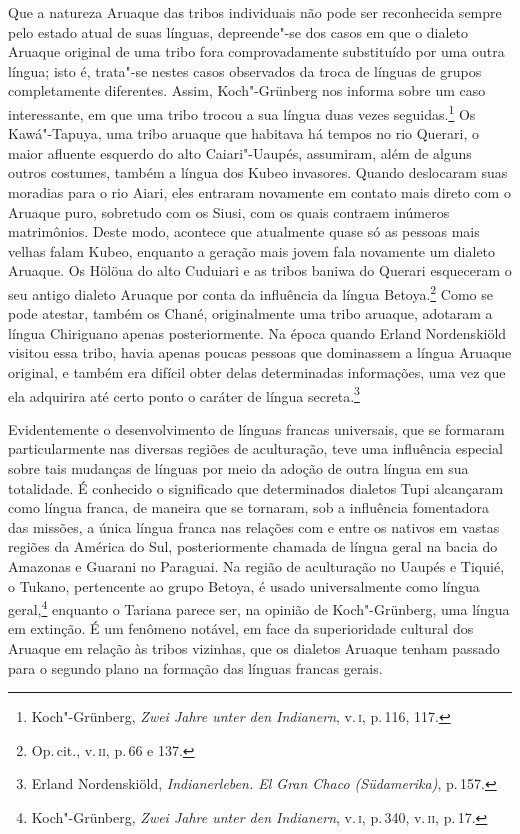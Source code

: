 Que a natureza Aruaque das tribos individuais não pode ser reconhecida
sempre pelo estado atual de suas línguas, depreende"-se dos casos em que
o dialeto Aruaque original de uma tribo fora comprovadamente substituído
por uma outra língua; isto é, trata"-se nestes casos observados da troca
de línguas de grupos completamente diferentes. Assim, Koch"-Grünberg nos
informa sobre um caso interessante, em que uma tribo trocou a sua língua
duas vezes seguidas.\footnote{Koch"-Grünberg, \textit{Zwei Jahre unter den
  Indianern}, v.\,\textsc{i}, p.\,116, 117.} Os Kawá"-Tapuya, uma tribo aruaque que
habitava há tempos no rio Querari, o maior afluente esquerdo do alto
Caiari"-Uaupés, assumiram, além de alguns outros costumes, também a
língua dos Kubeo invasores. Quando deslocaram suas moradias para o rio
Aiari, eles entraram novamente em contato mais direto com o Aruaque
puro, sobretudo com os Siusi, com os quais contraem inúmeros
matrimônios. Deste modo, acontece que atualmente quase só as pessoas
mais velhas falam Kubeo, enquanto a geração mais jovem fala novamente um
dialeto Aruaque. Os Hölöua do alto Cuduiari e as tribos baniwa do
Querari esqueceram o seu antigo dialeto Aruaque por conta da influência
da língua Betoya.\footnote{Op.\,cit., v.\,\textsc{ii}, p.\,66 e 137.} Como se pode
atestar, também os Chané, originalmente uma tribo aruaque, adotaram a
língua Chiriguano apenas posteriormente. Na época quando Erland
Nordenskiöld visitou essa tribo, havia apenas poucas pessoas que
dominassem a língua Aruaque original, e também era difícil obter delas
determinadas informações, uma vez que ela adquirira até
certo ponto o caráter de língua secreta.\footnote{Erland Nordenskiöld,
  \textit{Indianerleben. El Gran Chaco (Südamerika)}, p.\,157.}

Evidentemente o desenvolvimento de línguas francas universais, que se
formaram particularmente nas diversas regiões de aculturação, teve uma
influência especial sobre tais mudanças de línguas por meio da adoção
de outra língua em sua totalidade. É conhecido o significado que
determinados dialetos Tupi alcançaram como língua franca, de maneira que
se tornaram, sob a influência fomentadora das missões, a única língua
franca nas relações com e entre os nativos em vastas regiões da América
do Sul, posteriormente chamada de língua geral na bacia do Amazonas e
Guarani no Paraguai. Na região de aculturação no Uaupés e Tiquié, o
Tukano, pertencente ao grupo Betoya, é usado universalmente como língua
geral,\footnote{Koch"-Grünberg, \textit{Zwei Jahre unter den Indianern}, v.\,\textsc{i}, p.\,340, v.\,\textsc{ii}, p.\,17.} enquanto o Tariana parece ser, na opinião
de Koch"-Grünberg, uma língua em extinção. É um fenômeno notável, em face
da superioridade cultural dos Aruaque em relação às tribos vizinhas, que
os dialetos Aruaque tenham passado para o segundo plano na formação
das línguas francas gerais.

